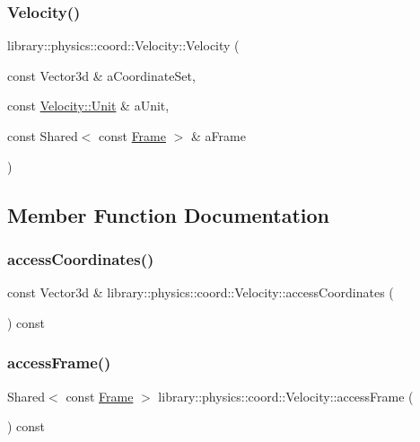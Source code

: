 \subsubsection{\texorpdfstring{Velocity()}{Velocity()}}
{\footnotesize\ttfamily library\+::physics\+::coord\+::\+Velocity\+::\+Velocity (\begin{DoxyParamCaption}\item[{const Vector3d \&}]{a\+Coordinate\+Set,  }\item[{const \hyperlink{classlibrary_1_1physics_1_1coord_1_1_velocity_a8bbc811932c454dbe0ab8b56f1b2c0b3}{Velocity\+::\+Unit} \&}]{a\+Unit,  }\item[{const Shared$<$ const \hyperlink{classlibrary_1_1physics_1_1coord_1_1_frame}{Frame} $>$ \&}]{a\+Frame }\end{DoxyParamCaption})}



\subsection{Member Function Documentation}
\mbox{\label{classlibrary_1_1physics_1_1coord_1_1_velocity_aea8fe9c62293e20393d9a662f277b0e7}} 
\subsubsection{\texorpdfstring{access\+Coordinates()}{accessCoordinates()}}
{\footnotesize\ttfamily const Vector3d \& library\+::physics\+::coord\+::\+Velocity\+::access\+Coordinates (\begin{DoxyParamCaption}{ }\end{DoxyParamCaption}) const}

\mbox{\label{classlibrary_1_1physics_1_1coord_1_1_velocity_a1d3dc032dba7937276b06649cb16a871}} 
\subsubsection{\texorpdfstring{access\+Frame()}{accessFrame()}}
{\footnotesize\ttfamily Shared$<$ const \hyperlink{classlibrary_1_1physics_1_1coord_1_1_frame}{Frame} $>$ library\+::physics\+::coord\+::\+Velocity\+::access\+Frame (\begin{DoxyParamCaption}{ }\end{DoxyParamCaption}) const}

